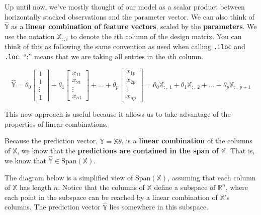 \documentclass[
  letterpaper,
  DIV=11,
  numbers=noendperiod]{scrreprt}
\begin{document}
Up until now, we've mostly thought of our model as a scalar product
between horizontally stacked observations and the parameter vector. We
can also think of \(\hat{\mathbb{Y}}\) as a \textbf{linear combination
of feature vectors}, scaled by the \textbf{parameters}. We use the
notation \(\mathbb{X}_{:, i}\) to denote the \(i\)th column of the
design matrix. You can think of this as following the same convention as
used when calling \texttt{.iloc} and \texttt{.loc}. ``:'' means that we
are taking all entries in the \(i\)th column.

\[
\hat{\mathbb{Y}} = 
\theta_0 \begin{bmatrix}
           1 \\
           1 \\
           \vdots \\
           1
         \end{bmatrix} + \theta_1 \begin{bmatrix}
           x_{11} \\
           x_{21} \\
           \vdots \\
           x_{n1}
         \end{bmatrix} + \ldots + \theta_p \begin{bmatrix}
           x_{1p} \\
           x_{2p} \\
           \vdots \\
           x_{np}
         \end{bmatrix}
         = \theta_0 \mathbb{X}_{:,\:1} + \theta_1 \mathbb{X}_{:,\:2} + \ldots + \theta_p \mathbb{X}_{:,\:p+1}\]

This new approach is useful because it allows us to take advantage of
the properties of linear combinations.

Because the prediction vector, \(\hat{\mathbb{Y}} = \mathbb{X} \theta\),
is a \textbf{linear combination} of the columns of \(\mathbb{X}\), we
know that the \textbf{predictions are contained in the span of
\(\mathbb{X}\)}. That is, we know that
\(\mathbb{\hat{Y}} \in \text{Span}(\mathbb{X})\).

The diagram below is a simplified view of \(\text{Span}(\mathbb{X})\),
assuming that each column of \(\mathbb{X}\) has length \(n\). Notice
that the columns of \(\mathbb{X}\) define a subspace of
\(\mathbb{R}^n\), where each point in the subspace can be reached by a
linear combination of \(\mathbb{X}\)'s columns. The prediction vector
\(\mathbb{\hat{Y}}\) lies somewhere in this subspace.
\end{document}
